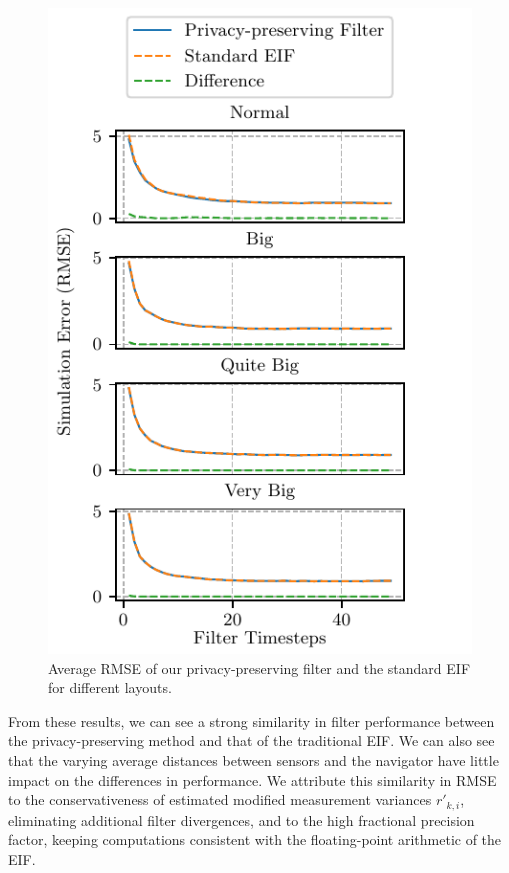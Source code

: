 \begin{figure}[htbp]
    \centering
    \includegraphics{figures/layout_errors.pdf}
    \caption{Average RMSE of our privacy-preserving filter and the standard EIF for different layouts.}
    \vspace{-\baselineskip}
    \label{fig:sim_layout_errors}
\end{figure}
From these results, we can see a strong similarity in filter performance between the privacy-preserving method and that of the traditional EIF. We can also see that the varying average distances between sensors and the navigator have little impact on the differences in performance. We attribute this similarity in RMSE to the conservativeness of estimated modified measurement variances $r'_{k,i}$, eliminating additional filter divergences, and to the high fractional precision factor, keeping computations consistent with the floating-point arithmetic of the EIF.


